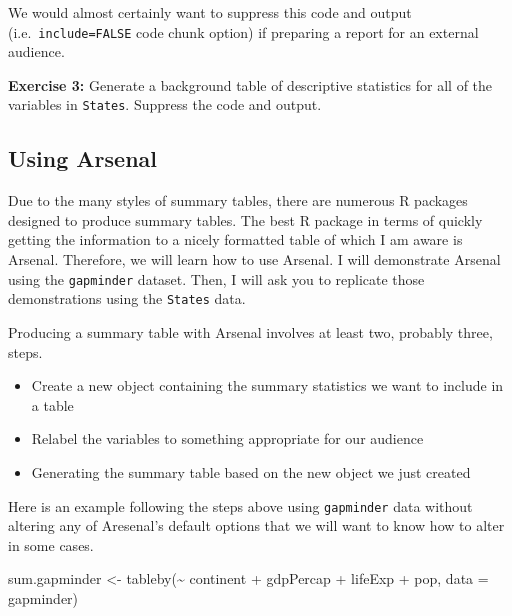\documentclass[
]{book}
\makeatletter
\newenvironment{Shaded}{\begin{snugshade}}{\end{snugshade}}
\newcommand{\AttributeTok}[1]{\textcolor[rgb]{0.61,0.61,0.61}{#1}}
\newcommand{\FunctionTok}[1]{\textcolor[rgb]{0,0,0}{#1}}
\newcommand{\NormalTok}[1]{#1}
\newcommand{\OtherTok}[1]{\textcolor[rgb]{0.37,0.37,0.37}{#1}}
\newcommand{\SpecialCharTok}[1]{\textcolor[rgb]{0,0,0}{#1}}
\providecommand{\tightlist}{%
  \setlength{\itemsep}{0pt}\setlength{\parskip}{0pt}}
\newenvironment{kframe}{%
\medskip{}
\setlength{\fboxsep}{.8em}
 \def\at@end@of@kframe{}%
 \ifinner\ifhmode%
  \def\at@end@of@kframe{\end{minipage}}%
  \begin{minipage}{\columnwidth}%
 \fi\fi%
 \def\FrameCommand##1{\hskip\@totalleftmargin \hskip-\fboxsep
 \colorbox{shadecolor}{##1}\hskip-\fboxsep
     \hskip-\linewidth \hskip-\@totalleftmargin \hskip\columnwidth}%
 \MakeFramed {\advance\hsize-\width
   \@totalleftmargin\z@ \linewidth\hsize
   \@setminipage}}%
 {\par\unskip\endMakeFramed%
 \at@end@of@kframe}
\renewenvironment{Shaded}{\begin{kframe}}{\end{kframe}}
\newenvironment{rmdblock}[1]
  {\begin{shaded*}
  }
  {\end{shaded*}
  }
\newenvironment{learncheck}
  {\begin{rmdblock}{warning}}
  {\end{rmdblock}}
\makeatother
\begin{document}
We would almost certainly want to suppress this code and output (i.e.~\texttt{include=FALSE} code chunk option) if preparing a report for an external audience.

\begin{learncheck}
\textbf{Exercise 3:} Generate a background table of descriptive
statistics for all of the variables in \texttt{States}. Suppress the
code and output.
\end{learncheck}

\hypertarget{using-arsenal}{%
\subsection{Using Arsenal}\label{using-arsenal}}

Due to the many styles of summary tables, there are numerous R packages designed to produce summary tables. The best R package in terms of quickly getting the information to a nicely formatted table of which I am aware is Arsenal. Therefore, we will learn how to use Arsenal. I will demonstrate Arsenal using the \texttt{gapminder} dataset. Then, I will ask you to replicate those demonstrations using the \texttt{States} data.

Producing a summary table with Arsenal involves at least two, probably three, steps.

\begin{itemize}
\tightlist
\item
  Create a new object containing the summary statistics we want to include in a table
\item
  Relabel the variables to something appropriate for our audience
\item
  Generating the summary table based on the new object we just created
\end{itemize}

Here is an example following the steps above using \texttt{gapminder} data without altering any of Aresenal's default options that we will want to know how to alter in some cases.

\begin{Shaded}
\begin{Highlighting}[]
\NormalTok{sum.gapminder }\OtherTok{\textless{}{-}} \FunctionTok{tableby}\NormalTok{(}\SpecialCharTok{\textasciitilde{}}\NormalTok{ continent }\SpecialCharTok{+}\NormalTok{ gdpPercap }\SpecialCharTok{+}\NormalTok{ lifeExp }\SpecialCharTok{+}\NormalTok{ pop, }\AttributeTok{data =}\NormalTok{ gapminder)}
\end{Highlighting}
\end{Shaded}
\end{document}
